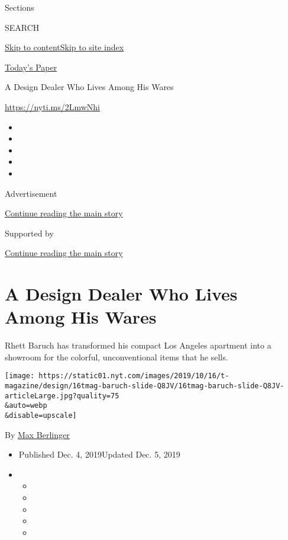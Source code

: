 Sections

SEARCH

\protect\hyperlink{site-content}{Skip to
content}\protect\hyperlink{site-index}{Skip to site index}

\href{https://myaccount.nytimes.com/auth/login?response_type=cookie\&client_id=vi}{}

\href{https://www.nytimes.com/section/todayspaper}{Today's Paper}

A Design Dealer Who Lives Among His Wares

\href{https://nyti.ms/2LmwNhi}{https://nyti.ms/2LmwNhi}

\begin{itemize}
\item
\item
\item
\item
\item
\end{itemize}

Advertisement

\protect\hyperlink{after-top}{Continue reading the main story}

Supported by

\protect\hyperlink{after-sponsor}{Continue reading the main story}

\hypertarget{a-design-dealer-who-lives-among-his-wares}{%
\section{A Design Dealer Who Lives Among His
Wares}\label{a-design-dealer-who-lives-among-his-wares}}

Rhett Baruch has transformed his compact Los Angeles apartment into a
showroom for the colorful, unconventional items that he sells.

\texttt{[image: https://static01.nyt.com/images/2019/10/16/t-magazine/design/16tmag-baruch-slide-Q8JV/16tmag-baruch-slide-Q8JV-articleLarge.jpg?quality=75\\\&auto=webp\\\&disable=upscale]}

By \href{https://www.nytimes.com/by/max-berlinger}{Max Berlinger}

\begin{itemize}
\item
  Published Dec. 4, 2019Updated Dec. 5, 2019
\item
  \begin{itemize}
  \item
  \item
  \item
  \item
  \item
  \end{itemize}
\end{itemize}

